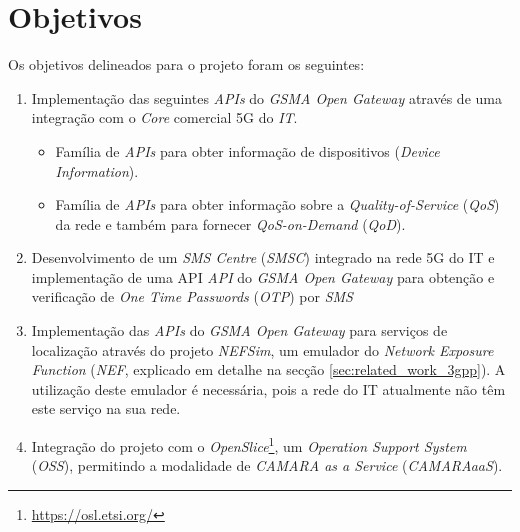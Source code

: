 \section{Objetivos}

Os objetivos delineados para o projeto foram os seguintes:

\begin{enumerate}
  \item Implementação das seguintes \emph{APIs} do \emph{GSMA Open Gateway}
    através de uma integração com o \emph{Core} comercial 5G do \emph{IT}.
    \begin{itemize}
      \item Família de \emph{APIs} para obter informação de
        dispositivos (\emph{Device Information}).
      \item Família de \emph{APIs} para obter informação sobre a
        \emph{Quality-of-Service} (\emph{QoS}) da rede e também para
        fornecer \emph{QoS-on-Demand} (\emph{QoD}).
    \end{itemize}
  \item Desenvolvimento de um \emph{SMS Centre} (\emph{SMSC}) integrado na rede 5G do IT e implementação
    de uma API \emph{API} do \emph{GSMA Open Gateway} para obtenção
    e verificação de \emph{One Time Passwords} (\emph{OTP}) por \emph{SMS}
  \item Implementação das \emph{APIs} do \emph{GSMA Open Gateway} para
    serviços de localização através do projeto \emph{NEFSim}, um emulador
    do \emph{Network Exposure Function} (\emph{NEF}, explicado em detalhe
    na secção \ref{sec:related_work_3gpp}). A utilização deste emulador é
    necessária, pois a rede do IT atualmente não têm este serviço na sua
    rede.
  \item Integração do projeto com o
    \emph{OpenSlice}\footnote{\url{https://osl.etsi.org/}}, um
    \emph{Operation Support System} (\emph{OSS}), permitindo a modalidade
    de \emph{CAMARA as a Service} (\emph{CAMARAaaS}).
\end{enumerate}
